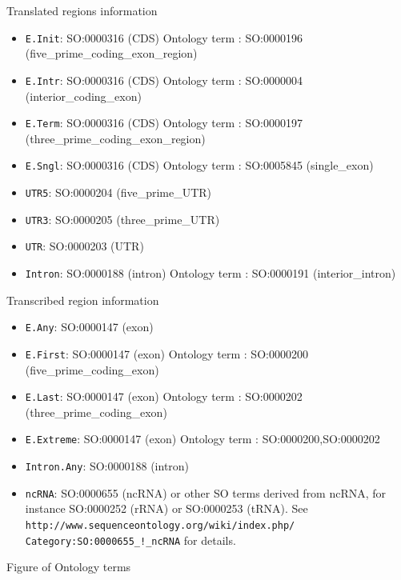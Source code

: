 Translated regions information
\begin{itemize}
\item \texttt{E.Init}: SO:0000316 (CDS) Ontology term :	SO:0000196 (five\_prime\_coding\_exon\_region)
\item \texttt{E.Intr}: SO:0000316 (CDS) Ontology term :	SO:0000004 (interior\_coding\_exon)
\item \texttt{E.Term}: SO:0000316 (CDS) Ontology term :	SO:0000197 (three\_prime\_coding\_exon\_region)
\item \texttt{E.Sngl}: SO:0000316 (CDS) Ontology term :	SO:0005845 (single\_exon)
\item \texttt{UTR5}:   SO:0000204 (five\_prime\_UTR)
\item \texttt{UTR3}:   SO:0000205 (three\_prime\_UTR)
\item \texttt{UTR}:    SO:0000203 (UTR)
\item \texttt{Intron}: SO:0000188 (intron) Ontology term : SO:0000191	(interior\_intron)
\end{itemize}

Transcribed region information
\begin{itemize}
\item \texttt{E.Any}: 		SO:0000147 (exon)
\item \texttt{E.First}: 	SO:0000147 (exon)	Ontology term :	SO:0000200 (five\_prime\_coding\_exon)
\item \texttt{E.Last}: 		SO:0000147 (exon)	Ontology term :	SO:0000202 (three\_prime\_coding\_exon)
\item \texttt{E.Extreme}: 	SO:0000147 (exon)	Ontology term :	SO:0000200,SO:0000202
\item \texttt{Intron.Any}: 	SO:0000188 (intron)
\item \texttt{ncRNA}: 	        SO:0000655 (ncRNA) or other SO terms derived from ncRNA, for instance SO:0000252 (rRNA) or SO:0000253 (tRNA). 
See  \texttt{http://www.sequenceontology.org/wiki/index.php/} \texttt{Category:SO:0000655\_!\_ncRNA} for details.

\end{itemize}
Figure of Ontology terms

